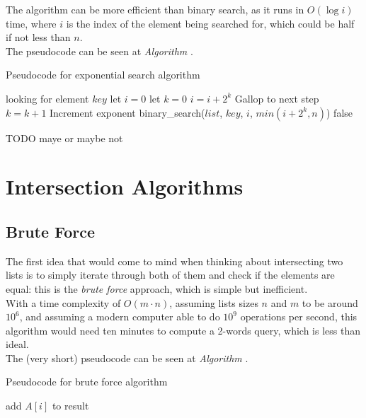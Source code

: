 The algorithm can be more efficient than binary search, as it runs in $O(\log i)$ time, where $i$ is the index of the element being searched for, which could be half if not less than $n$.\\
The pseudocode can be seen at \textit{Algorithm} .\\

\begin{algorithm}
    \captionsetup{labelsep=newline}
    \caption{Pseudocode for exponential search algorithm \label{alg:expsearch}}
    \begin{algorithmic}[1]
        \State looking for element $key$
        \State let $i=0$ 
        \State let $k=0$
            \State $i=i+2^k$ \Comment Gallop to next step
            \State $k=k+1$ \Comment Increment exponent
        \EndWhile
            \State binary\_search($list$, $key$, $i$, $min(i+2^k,n)$) 
        \Else
            \State \Return false 
        \EndIf
    \end{algorithmic}
\end{algorithm}

TODO maye or maybe not 

\section{Intersection Algorithms}

\subsection{Brute Force \label{sec:bruteforce}}

The first idea that would come to mind when thinking about intersecting two lists is to simply iterate through both of them and check if the elements are equal: this is the \textit{brute force} approach, which is simple but inefficient. \\
With a time complexity of $O(m \cdot n)$, assuming lists sizes $n$ and $m$ to be around $10^6$, and assuming a modern computer able to do $10^9$ operations per second, this algorithm would need ten minutes to compute a 2-words query, which is less than ideal.\\
The (very short) pseudocode can be seen at \textit{Algorithm} .\\

\begin{algorithm}
    \captionsetup{labelsep=newline}
    \caption{Pseudocode for brute force algorithm \label{alg:bruteforce}}
    \begin{algorithmic}[1]
                    \State add $A[i]$ to result
                \EndIf
            \EndFor
        \EndFor
    \end{algorithmic}
\end{algorithm}

